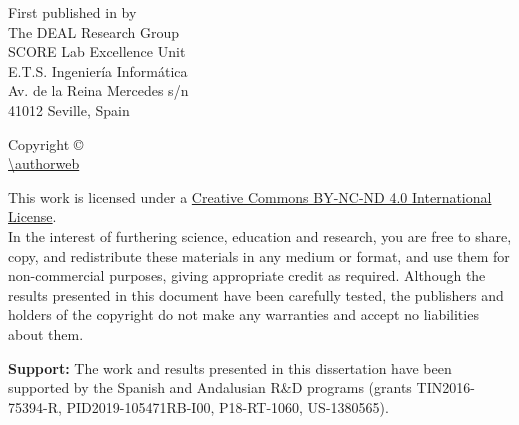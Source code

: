 \cleardoublepage

\noindent First published in \monthyeardate{} by\\
The DEAL Research Group\\

\noindent SCORE Lab Excellence Unit\\

\noindent E.T.S. Ingeniería Informática\\
Av. de la Reina Mercedes s/n\\
41012 Seville, Spain

\vspace{.5cm}
\noindent Copyright \copyright{} \romanyear \autor\\
\url{\authorweb}\\
\href{mailto:\authormail}{\texttt{\authormail}}

\vspace{.5cm}

\noindent This work is licensed under a \href{http://creativecommons.org/licenses/by-nc-nd/4.0}{Creative Commons BY-NC-ND 4.0 International License}.\\
In the interest of furthering science, education and research, you are free to share, copy, and redistribute these materials in any medium or format, and use them for non-commercial purposes, giving appropriate credit as required. Although the results presented in this document have been carefully tested, the publishers and holders of the copyright do not make any warranties and accept no liabilities about them.

\vspace{10cm}

\noindent \textbf{Support:} The work and results presented in this dissertation have been supported by the Spanish and Andalusian R\&D programs (grants TIN2016-75394-R, PID2019-105471RB-I00, P18-RT-1060, US-1380565).